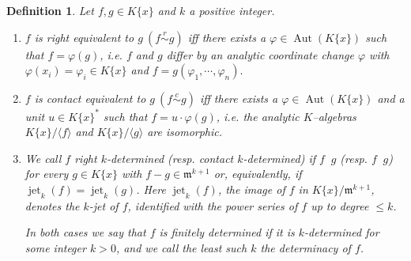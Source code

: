 \documentclass[11pt]{article}
\DeclareMathOperator{\Aut}{Aut}
\DeclareMathOperator{\jet}{jet}
\DeclareMathOperator{\rsim}{\stackrel{r}{\sim}}
\DeclareMathOperator{\csim}{\stackrel{c}{\sim}}
\newtheorem{Definition}{Definition}[section]
\newcommand{\fm}{\mathfrak{m}}
\begin{document}
\begin{Definition}\label{def:equiv}
Let $f,g  \in K\{x\}$ and  $k$ a positive integer.
\begin{enumerate}
\item $f$ is {\em right equivalent}
 to $g  \ (f\overset{r}{\sim} g)$ iff
 there exists a $\varphi \in \Aut(K\{x\})$ such that  $f= \varphi(g)$, 
i.e. $f$ and $g$ differ by an analytic coordinate change $\varphi$ with $\varphi(x_i)=\varphi_i \in K\{x\}$ and $f=g(\varphi_1, \cdots, \varphi_n).$

\item $f$ is {\em  contact equivalent} to $g \ (f \overset{c}{\sim} g)$ iff
 there exists a  $\varphi \in \Aut (K\{x\})$ and a unit $u \in K\{x\}^\ast$ such that $f=u\cdot\varphi(g)$, 
i.e. the analytic $K$--algebras $K\{x\}/\langle f\rangle$ and $K\{x\}/\langle g\rangle$ are isomorphic.

\item We call $f$ {\em right $k$-determined} (resp. {\em contact $k$-determined}) if $f \rsim g$ (resp. $f \csim g$) for every  $g \in K\{x\}$ with $f-g \in \fm^{k+1}$ or, equivalently, if $\jet_k(f) = \jet_k(g)$. Here $\jet_k(f)$,  the image of $f$ in $K\{x\}/\fm^{k+1}$, denotes the {\em $k$-jet} of $f$, identified with the power series  of $f$ up to degree $\le k$. 

In both cases we say that $f$ is \emph{finitely determined} if it is $k$-determined for some integer $k>0$, and we call the least such $k$ the \emph{determinacy} of $f$. 
\end{enumerate}
\end{Definition}
\end{document}
